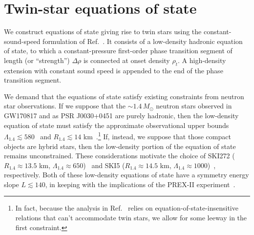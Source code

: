 \documentclass[aps,prd,twocolumn,superscriptaddress,nofootinbib]{revtex4-1}
\newcommand{\Msun}{\ensuremath{\,M_{\odot}}}
\begin{document}
\section{Twin-star equations of state}\label{Sec_PT}

We construct equations of state giving rise to twin stars using the constant-sound-speed formulation of Ref.~\cite{HanSteiner2019}. It consists of a low-density hadronic equation of state, to which a constant-pressure first-order phase transition segment of length (or ``strength'') $\Delta\rho$ is connected at onset density $\rho_t$. A high-density extension with constant sound speed is appended to the end of the phase transition segment.

We demand that the equations of state satisfy existing constraints from neutron star observations. If we suppose that the $\sim 1.4\Msun$ neutron stars observed in GW170817 and as PSR J0030+0451 are purely hadronic, then the low-density equation of state must satisfy the approximate observational upper bounds $\Lambda_{1.4} \lesssim 580$~\cite{LVC_GW170817eos} and $R_{1.4} \lesssim 14$ km~\cite{MillerLamb2019}.\footnote{In fact, because the analysis in Ref.~\cite{LVC_GW170817eos} relies on equation-of-state-insensitive relations that can't accommodate twin stars, we allow for some leeway in the first constraint.} If, instead, we suppose that those compact objects are hybrid stars, then the low-density portion of the equation of state remains unconstrained. These considerations motivate the choice of SKI272 ($R_{1.4} \approx 13.5$ km, $\Lambda_{1.4} \approx 650$)~\cite{AgrawalShlomo2003} and SKI5 ($R_{1.4} \approx 14.5$ km, $\Lambda_{1.4} \approx 1000$)~\cite{ReinhardFlocard1995,BertulaniValencia2019}, respectively. Both of these low-density equations of state have a symmetry energy slope $L \lesssim 140$, in keeping with the implications of the PREX-II experiment~\cite{ReedFattoyev2021}.
\end{document}
